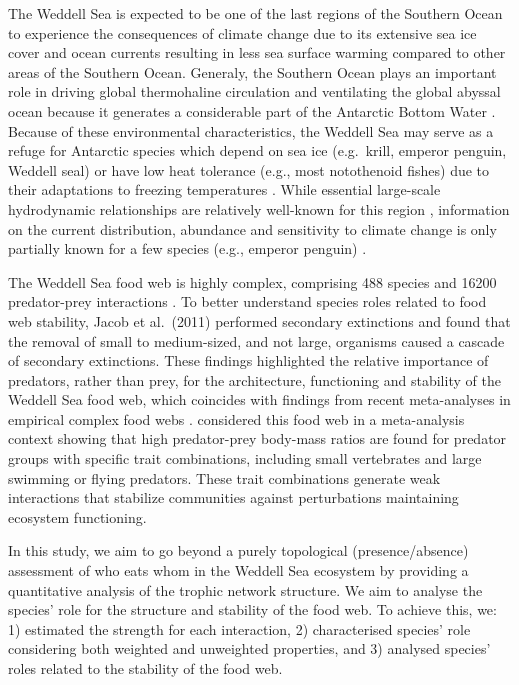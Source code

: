 \documentclass[gc, manuscript]{copernicus}
\begin{document}
The Weddell Sea is expected to be one of the last regions of the
Southern Ocean to experience the consequences of climate change due to
its extensive sea ice cover and ocean currents \citep{Teschke2021}
resulting in less sea surface warming compared to other areas of the
Southern Ocean. Generaly, the Southern Ocean plays an important role in
driving global thermohaline circulation and ventilating the global
abyssal ocean because it generates a considerable part of the Antarctic
Bottom Water \citep{Fahrbach2009}. Because of these environmental
characteristics, the Weddell Sea may serve as a refuge for Antarctic
species which depend on sea ice (e.g.~krill, emperor penguin, Weddell
seal) or have low heat tolerance (e.g., most notothenoid fishes) due to
their adaptations to freezing temperatures \citep{Griffiths2017}. While
essential large-scale hydrodynamic relationships are relatively
well-known for this region \citep{deSteur2019}, information on the
current distribution, abundance and sensitivity to climate change is
only partially known for a few species (e.g., emperor penguin)
\citep{Houstin2022}.

The Weddell Sea food web is highly complex, comprising 488 species and
16200 predator-prey interactions \citep{Jacob2011}. To better understand
species roles related to food web stability, Jacob et al.~(2011)
performed secondary extinctions and found that the removal of small to
medium-sized, and not large, organisms caused a cascade of secondary
extinctions. These findings highlighted the relative importance of
predators, rather than prey, for the architecture, functioning and
stability of the Weddell Sea food web, which coincides with findings
from recent meta-analyses in empirical complex food webs
\citep{Brose2019, Perkins2022}. \citet{Brose2019} considered this food
web in a meta-analysis context showing that high predator-prey body-mass
ratios are found for predator groups with specific trait combinations,
including small vertebrates and large swimming or flying predators.
These trait combinations generate weak interactions that stabilize
communities against perturbations maintaining ecosystem functioning.

In this study, we aim to go beyond a purely topological
(presence/absence) assessment of who eats whom in the Weddell Sea
ecosystem by providing a quantitative analysis of the trophic network
structure. We aim to analyse the species' role for the structure and
stability of the food web. To achieve this, we: 1) estimated the
strength for each interaction, 2) characterised species' role
considering both weighted and unweighted properties, and 3) analysed
species' roles related to the stability of the food web.
\end{document}
